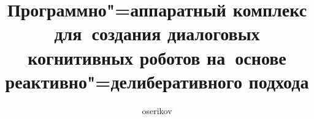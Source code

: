 \title{Программно"=аппаратный комплекс для~создания диалоговых когнитивных роботов на~основе реактивно"=делиберативного подхода}
\author{oserikov}
\maketitle